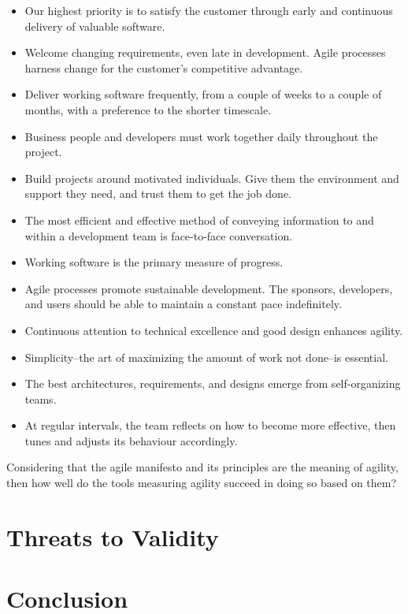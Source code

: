 \begin{itemize}
	\item Our highest priority is to satisfy the customer through early and continuous delivery of valuable software.
    \item Welcome changing requirements, even late in development. Agile processes harness change for the customer's competitive advantage.
    \item Deliver working software frequently, from a couple of weeks to a couple of months, with a preference to the shorter timescale.
    \item Business people and developers must work together daily throughout the project.
    \item Build projects around motivated individuals. Give them the environment and support they need, and trust them to get the job done.
    \item The most efficient and effective method of conveying information to and within a development team is face-to-face conversation.
    \item Working software is the primary measure of progress.
    \item Agile processes promote sustainable development. The sponsors, developers, and users should be able to maintain a constant pace indefinitely.
    \item Continuous attention to technical excellence and good design enhances agility.
    \item Simplicity--the art of maximizing the amount of work not done--is essential.
    \item The best architectures, requirements, and designs emerge from self-organizing teams.
    \item At regular intervals, the team reflects on how to become more effective, then tunes and adjusts its behaviour accordingly.
\end{itemize}

Considering that the agile manifesto and its principles are the meaning of agility, then how well do the tools measuring agility succeed in doing so based on them?



\section{Threats to Validity}






\section{Conclusion}




